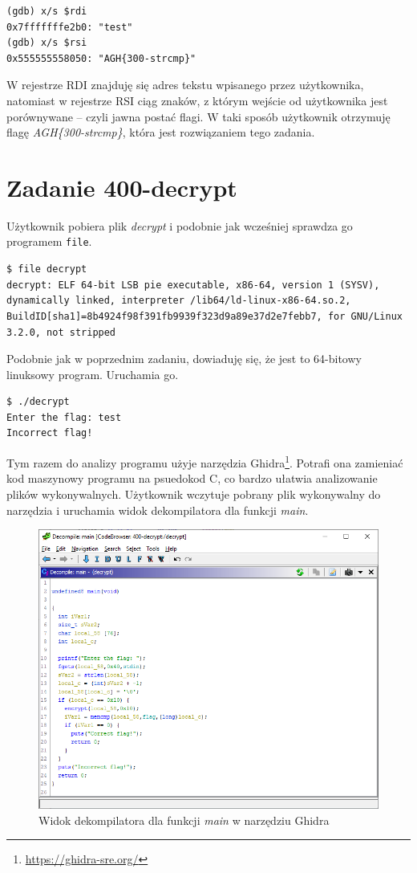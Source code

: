 \documentclass[language=polish,type=eng]{aghmodern}
\begin{document}
\begin{verbatim}
(gdb) x/s $rdi
0x7fffffffe2b0: "test"
(gdb) x/s $rsi
0x555555558050: "AGH{300-strcmp}"
\end{verbatim}

W rejestrze RDI znajduję się adres tekstu wpisanego przez użytkownika, natomiast
w rejestrze RSI ciąg znaków, z którym wejście od użytkownika jest porównywane -- czyli
jawna postać flagi. W taki sposób użytkownik otrzymuję flagę \emph{AGH\{300-strcmp\}},
która jest rozwiązaniem tego zadania.

\section{Zadanie 400-decrypt}

Użytkownik pobiera plik \emph{decrypt} i podobnie jak wcześniej
sprawdza go programem \texttt{file}.

\begin{verbatim}
$ file decrypt
decrypt: ELF 64-bit LSB pie executable, x86-64, version 1 (SYSV), dynamically linked, interpreter /lib64/ld-linux-x86-64.so.2, BuildID[sha1]=8b4924f98f391fb9939f323d9a89e37d2e7febb7, for GNU/Linux 3.2.0, not stripped
\end{verbatim}

Podobnie jak w poprzednim zadaniu, dowiaduję się, że jest to 64-bitowy linuksowy program.
Uruchamia go.

\begin{verbatim}
$ ./decrypt
Enter the flag: test
Incorrect flag!
\end{verbatim}

Tym razem do analizy programu użyje narzędzia Ghidra\footnote{\url{https://ghidra-sre.org/}}.
Potrafi ona zamieniać kod maszynowy programu na psuedokod C, co bardzo ułatwia
analizowanie plików wykonywalnych.
Użytkownik wczytuje pobrany plik wykonywalny do narzędzia i uruchamia widok dekompilatora
dla funkcji \emph{main}.

\begin{figure}[H]
\centering
\includegraphics[width=\textwidth]{400_main}
\caption{Widok dekompilatora dla funkcji \emph{main} w narzędziu Ghidra}
\end{figure}
\end{document}
